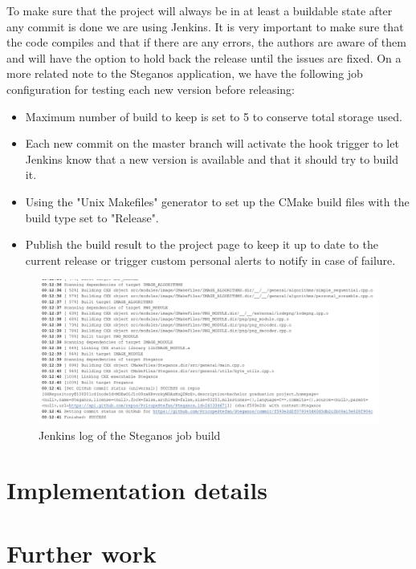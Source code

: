 \begin{multicols}{2}
To make sure that the project will always be in at least a buildable state after any commit is done we are using Jenkins. It is very important to make sure that the code compiles and that if there are any errors, the authors are aware of them and will have the option to hold back the release until the issues are fixed. On a more related note to the Steganos application, we have the following job configuration for testing each new version before releasing:
\begin{itemize}
	\item Maximum number of build to keep is set to 5 to conserve total storage used.
	\item Each new commit on the master branch will activate the hook trigger to let Jenkins know that a new version is available and that it should try to build it.
	\item Using the "Unix Makefiles" generator to set up the CMake build files with the build type set to "Release".
	\item Publish the build result to the project page to keep it up to date to the current release or trigger custom personal alerts to notify in case of failure.
\end{itemize}
\end{multicols}

\begin{figure}[H]
    \centering
    \includegraphics[width=15cm,keepaspectratio]{pics/application_chapter/jenkins_project_build}
    \caption{Jenkins log of the Steganos job build}
    \label{jenkins-log}
\end{figure}

\begin{multicols*}{2}
\section{Implementation details}

\section{Further work}
\end{multicols*}